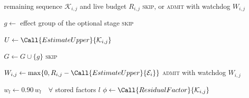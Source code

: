 \begin{algorithm}[t]
\caption{Remaining-Sequence Admission Flow}
\label{alg:admission_flow}
\small
\begin{algorithmic}[1]
\Require remaining sequence $\mathcal{K}_{i,j}$ and live budget $R_{i,j}$
\Ensure \textsc{skip}, or \textsc{admit} with watchdog $W_{i,j}$

  \State $g \gets$ effect group of the optional stage
    \State \Return \textsc{skip}
  \EndIf

  \State $U \gets \Call{EstimateUpper}{\mathcal{K}_{i,j}}$
  \State {}

    \State $G \gets G \cup \{g\}$
    \State \Return \textsc{skip}
  \EndIf

  \State $W_{i,j} \gets
    \max\{0,R_{i,j}-\Call{EstimateUpper}{\mathcal{E}_i}\}$
  \State \Return \textsc{admit} with watchdog $W_{i,j}$
\EndProcedure

\Statex
{} 
  \State $w_l \gets 0.90\,w_l \quad \forall$ stored factors $l$
    \State $\phi \gets \Call{ResidualFactor}{\mathcal{K}_{i,j}}$
    \State {}
  \EndFor
\EndProcedure
\end{algorithmic}
\end{algorithm}
